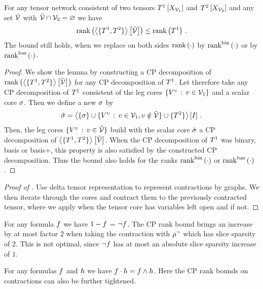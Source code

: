 \begin{lemma}\label{lem:sparsityDisjointContraction}
	For any tensor network consistent of two tensors $T^{1}\left[X_{\mathcal{V}_1}\right]$ and $T^{2}\left[X_{\mathcal{V}_2}\right]$ and any set $\tilde{\mathcal{V}}$ with $\tilde{\mathcal{V}}\cap\mathcal{V}_2=\varnothing$ we have
		\[ \mathrm{rank}\left(\left\langle \{T^{1},T^{2}\}\right\rangle \left[ \tilde{\mathcal{V}} \right]\right) \leq \mathrm{rank}\left(T^{1}\right) \, . \]
	The bound still holds, when we replace on both sides $\mathrm{rank}\left(\cdot\right)$ by $\mathrm{rank}^{\mathrm{bin}}\left(\cdot\right)$ or by $\mathrm{rank}^{\mathrm{bas}}\left(\cdot\right)$.
\end{lemma}
\begin{proof}
	We show the lemma by constructing a CP decomposition of $\mathrm{rank}\left(\left\langle \{T^{1},T^{2}\}\right\rangle \left[ \tilde{\mathcal{V}} \right]\right) $ for any CP decomposition of $T^{1}$.
	Let therefore take any CP decomposition of $T^{1}$ consistent of the leg cores $\{V^{v} \, : \, v \in \mathcal{V}_1 \}$ and a scalar core $\sigma$.
	Then we define a new $\sigma$ by
		\[ \tilde{\sigma} = \left\langle \{\sigma\}\cup \{V^{v} \, : \, v \in \mathcal{V}_1 , v \notin \tilde{\mathcal{V}} \} \cup \{T^{2}\} \right\rangle \left[ I \right] \, . \]
	Then, the leg cores $\{V^{v} \, : \, v \in \tilde{\mathcal{V}} \}$ build with the scalar core $\tilde{\sigma}$ a CP decomposition of $\left\langle \{T^{1},T^{2}\}\right\rangle \left[ \tilde{\mathcal{V}} \right]$.
	When the CP decomposition of $T^{1}$ was binary, basis or basis+, this property is also satisfied by the constructed CP decomposition.
	Thus the bound also holds for the ranks $\mathrm{rank}^{\mathrm{bin}}\left(\cdot\right)$ or $\mathrm{rank}^{\mathrm{bas}}\left(\cdot\right)$.
\end{proof}

\begin{proof}[Proof of ]
	Use delta tensor representation to represent contractions by graphs.
	We then iterate through the cores and contract them to the previously contracted tensor, where we apply  when the tensor core has variables left open and  if not.
\end{proof}


\begin{example}
	For any formula $f$ we have $1-f$ = $\lnot f$.
	The CP rank bound brings an increase by at most factor $2$ when taking the contraction with $\rho^{\lnot}$ which has slice sparsity of $2$.
	This is not optimal, since $\lnot f$ has at most an absolute slice sparsity increase of $1$.
	
	For any formulas $f$ and $h$ we have $f\cdot h = f\land h$.
	Here the CP rank bounds on contractions can also be further tightened.
\end{example}


